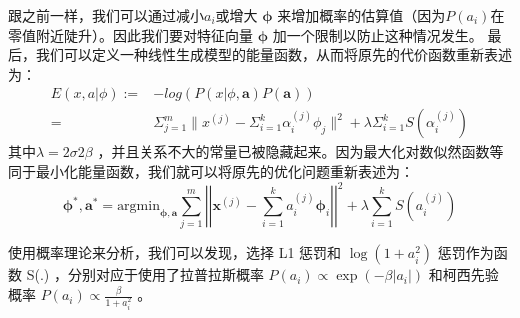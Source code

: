跟之前一样，我们可以通过减小$a_i$或增大 $\mathbf{\phi}$ 来增加概率的估算值（因为$P(a_i)$在零值附近陡升）。因此我们要对特征向量 $\mathbf{\phi}$ 加一个限制以防止这种情况发生。
最后，我们可以定义一种线性生成模型的能量函数，从而将原先的代价函数重新表述为：
\begin{align}
E(x,a|\phi):=&-log(P(x|\phi,\mathbf{a})P(\mathbf{a}))\\
            =&\Sigma_{j=1}^m\|x^{(j)}-\Sigma_{i=1}^k\alpha_i^{(j)}\phi_j\|^2+\lambda\Sigma_{i=1}^{k}S(\alpha_i^{(j)})
\end{align}
其中$\lambda = 2\sigma2\beta$ ，并且关系不大的常量已被隐藏起来。因为最大化对数似然函数等同于最小化能量函数，我们就可以将原先的优化问题重新表述为：
\begin{equation}
\mathbf{\phi}^{*},\mathbf{a}^{*}=\text{argmin}_{\mathbf{\phi},\mathbf{a}} \sum_{j=1}^{m} \left|\left| \mathbf{x}^{(j)} - \sum_{i=1}^k a^{(j)}_i \mathbf{\phi}_{i}\right|\right|^{2} + \lambda \sum_{i=1}^{k}S(a^{(j)}_i) 
\end{equation}

使用概率理论来分析，我们可以发现，选择 L1 惩罚和 $\log(1+a_i^2)$ 惩罚作为函数 S(.) ，分别对应于使用了拉普拉斯概率 $P(a_i) \propto \exp\left(-\beta|a_i|\right)$ 和柯西先验概率 $P(a_i) \propto \frac{\beta}{1+a_i^2}$ 。
